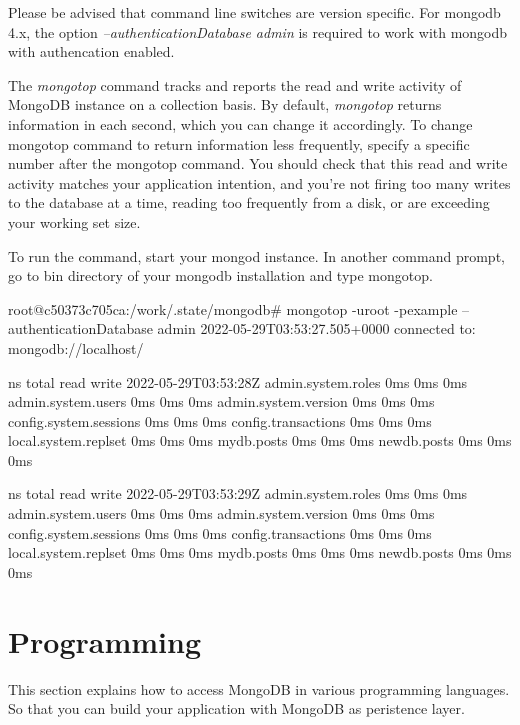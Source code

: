 \documentclass[12pt]{article}
\begin{document}
\begin{bashcode}
\begin{bashcode}
Please be advised that command line switches are version specific. 
For mongodb 4.x, the option \emph{--authenticationDatabase admin} is
required to work with mongodb with authencation enabled.


The \emph{mongotop} command tracks and reports the read and write
activity of MongoDB instance on a collection basis. By default,
\emph{mongotop} returns information in each second, which you can change
it accordingly. To change mongotop command to return information less
frequently, specify a specific number after the mongotop command. You
should check that this read and write activity matches your application
intention, and you’re not firing too many writes to the database at a
time, reading too frequently from a disk, or are exceeding your working
set size.

To run the command, start your mongod instance. In another command
prompt, go to bin directory of your mongodb installation and type
mongotop.


\begin{bashcode}
root@c50373c705ca:/work/.state/mongodb# mongotop -uroot -pexample --authenticationDatabase admin
2022-05-29T03:53:27.505+0000    connected to: mongodb://localhost/

                    ns    total    read    write    2022-05-29T03:53:28Z
    admin.system.roles      0ms     0ms      0ms
    admin.system.users      0ms     0ms      0ms
  admin.system.version      0ms     0ms      0ms
config.system.sessions      0ms     0ms      0ms
   config.transactions      0ms     0ms      0ms
  local.system.replset      0ms     0ms      0ms
            mydb.posts      0ms     0ms      0ms
           newdb.posts      0ms     0ms      0ms

                    ns    total    read    write    2022-05-29T03:53:29Z
    admin.system.roles      0ms     0ms      0ms
    admin.system.users      0ms     0ms      0ms
  admin.system.version      0ms     0ms      0ms
config.system.sessions      0ms     0ms      0ms
   config.transactions      0ms     0ms      0ms
  local.system.replset      0ms     0ms      0ms
            mydb.posts      0ms     0ms      0ms
           newdb.posts      0ms     0ms      0ms
\end{bashcode}

\newpage
\section{Programming}
This section explains how to access MongoDB in various programming
languages. So that you can build your application with MongoDB as
peristence layer.


\end{bashcode}
\end{bashcode}
\end{document}
